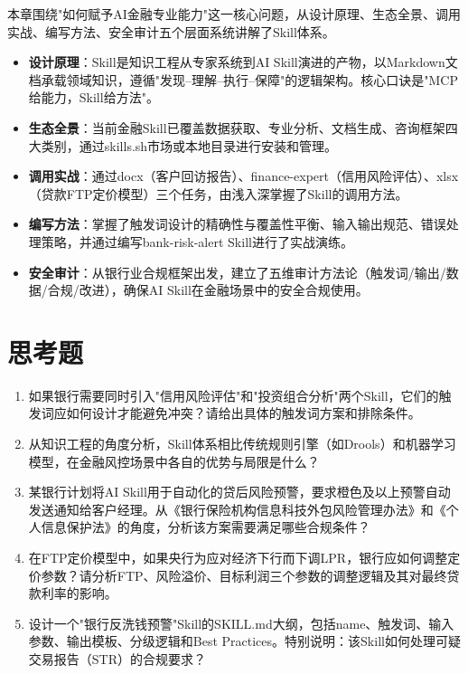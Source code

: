 
本章围绕"如何赋予AI金融专业能力"这一核心问题，从设计原理、生态全景、调用实战、编写方法、安全审计五个层面系统讲解了Skill体系。

\begin{itemize}[leftmargin=2em]
  \item \textbf{设计原理}：Skill是知识工程从专家系统到AI Skill演进的产物，以Markdown文档承载领域知识，遵循"发现--理解--执行--保障"的逻辑架构。核心口诀是"MCP给能力，Skill给方法"。
  \item \textbf{生态全景}：当前金融Skill已覆盖数据获取、专业分析、文档生成、咨询框架四大类别，通过skills.sh市场或本地目录进行安装和管理。
  \item \textbf{调用实战}：通过docx（客户回访报告）、finance-expert（信用风险评估）、xlsx（贷款FTP定价模型）三个任务，由浅入深掌握了Skill的调用方法。
  \item \textbf{编写方法}：掌握了触发词设计的精确性与覆盖性平衡、输入输出规范、错误处理策略，并通过编写bank-risk-alert Skill进行了实战演练。
  \item \textbf{安全审计}：从银行业合规框架出发，建立了五维审计方法论（触发词/输出/数据/合规/改进），确保AI Skill在金融场景中的安全合规使用。
\end{itemize}


\section*{思考题}

\begin{enumerate}[leftmargin=2em]
  \item 如果银行需要同时引入"信用风险评估"和"投资组合分析"两个Skill，它们的触发词应如何设计才能避免冲突？请给出具体的触发词方案和排除条件。

  \item 从知识工程的角度分析，Skill体系相比传统规则引擎（如Drools）和机器学习模型，在金融风控场景中各自的优势与局限是什么？

  \item 某银行计划将AI Skill用于自动化的贷后风险预警，要求橙色及以上预警自动发送通知给客户经理。从《银行保险机构信息科技外包风险管理办法》和《个人信息保护法》的角度，分析该方案需要满足哪些合规条件？

  \item 在FTP定价模型中，如果央行为应对经济下行而下调LPR，银行应如何调整定价参数？请分析FTP、风险溢价、目标利润三个参数的调整逻辑及其对最终贷款利率的影响。

  \item 设计一个"银行反洗钱预警"Skill的SKILL.md大纲，包括name、触发词、输入参数、输出模板、分级逻辑和Best Practices。特别说明：该Skill如何处理可疑交易报告（STR）的合规要求？
\end{enumerate}

